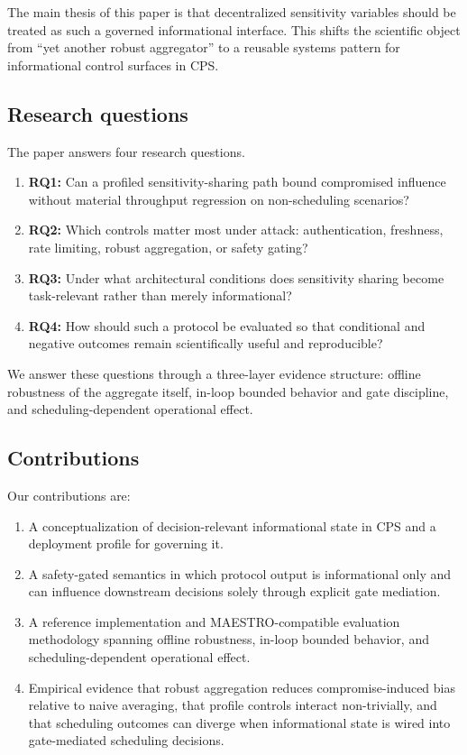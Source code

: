 \documentclass[11pt]{article}
\newcommand{\maestro}{MAESTRO}
\begin{document}
The main thesis of this paper is that decentralized sensitivity variables should be treated as such a governed informational interface. This shifts the scientific object from ``yet another robust aggregator'' to a reusable systems pattern for informational control surfaces in CPS.

\subsection{Research questions}

The paper answers four research questions.
\begin{enumerate}[leftmargin=1.5em]
    \item \textbf{RQ1:} Can a profiled sensitivity-sharing path bound compromised influence without material throughput regression on non-scheduling scenarios?
    \item \textbf{RQ2:} Which controls matter most under attack: authentication, freshness, rate limiting, robust aggregation, or safety gating?
    \item \textbf{RQ3:} Under what architectural conditions does sensitivity sharing become task-relevant rather than merely informational?
    \item \textbf{RQ4:} How should such a protocol be evaluated so that conditional and negative outcomes remain scientifically useful and reproducible?
\end{enumerate}

We answer these questions through a three-layer evidence structure: offline robustness of the aggregate itself, in-loop bounded behavior and gate discipline, and scheduling-dependent operational effect.

\subsection{Contributions}

Our contributions are:
\begin{enumerate}[leftmargin=1.5em]
    \item A conceptualization of decision-relevant informational state in CPS and a deployment profile for governing it.
    \item A safety-gated semantics in which protocol output is informational only and can influence downstream decisions solely through explicit gate mediation.
    \item A reference implementation and \maestro-compatible evaluation methodology spanning offline robustness, in-loop bounded behavior, and scheduling-dependent operational effect.
    \item Empirical evidence that robust aggregation reduces compromise-induced bias relative to naive averaging, that profile controls interact non-trivially, and that scheduling outcomes can diverge when informational state is wired into gate-mediated scheduling decisions.
\end{enumerate}
\end{document}
